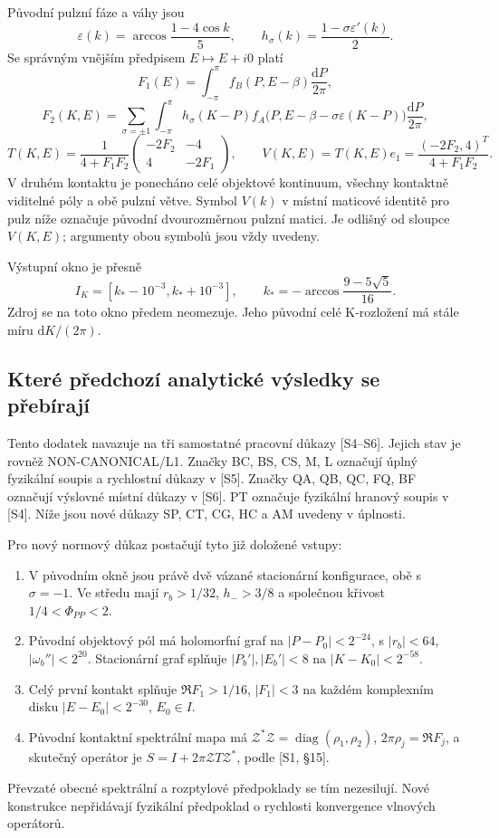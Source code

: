 \documentclass[11pt,a4paper]{article}
\theoremstyle{remark}\newtheorem{remark}[theorem]{Poznámka}
\numberwithin{equation}{section}
\begin{document}
Původní pulzní fáze a váhy jsou
\[
\varepsilon(k)=\arccos\frac{1-4\cos k}{5},\qquad
h_\sigma(k)=\frac{1-\sigma\varepsilon'(k)}2.
\]
Se správným vnějším předpisem \(E\mapsto E+i0\) platí
\[
F_1(E)=\int_{-\pi}^{\pi}f_B(P,E-\beta)\frac{\mathrm dP}{2\pi},
\]
\[
F_2(K,E)=\sum_{\sigma=\pm1}\int_{-\pi}^{\pi}
h_\sigma(K-P)f_A\bigl(P,E-\beta-\sigma\varepsilon(K-P)\bigr)
\frac{\mathrm dP}{2\pi},
\]
\[
T(K,E)=\frac1{4+F_1F_2}
\begin{pmatrix}-2F_2&-4\\4&-2F_1\end{pmatrix},\qquad
V(K,E)=T(K,E)e_1=\frac{(-2F_2,4)^T}{4+F_1F_2}.
\]
V druhém kontaktu je ponecháno celé objektové kontinuum,
všechny kontaktně viditelné póly a obě pulzní větve. Symbol
\(V(k)\) v místní maticové identitě pro pulz níže označuje
původní dvourozměrnou pulzní matici. Je odlišný od sloupce
\(V(K,E)\); argumenty obou symbolů jsou vždy uvedeny.


Výstupní okno je přesně
\[
I_K=[k_*-10^{-3},k_*+10^{-3}],\qquad
k_*=-\arccos\frac{9-5\sqrt5}{16}.
\]
Zdroj se na toto okno předem neomezuje. Jeho původní celé
K-rozložení má stále míru \(\mathrm dK/(2\pi)\).

\subsection{Které předchozí analytické výsledky se přebírají}

Tento dodatek navazuje na tři samostatné pracovní důkazy
[S4--S6]. Jejich stav je rovněž NON-CANONICAL/L1.
Značky BC, BS, CS, M, L označují úplný fyzikální soupis
a rychlostní důkazy v [S5]. Značky QA, QB, QC, FQ, BF
označují výslovné místní důkazy v [S6]. PT označuje
fyzikální hranový soupis v [S4]. Níže jsou nové důkazy
SP, CT, CG, HC a AM uvedeny v úplnosti.

Pro nový normový důkaz postačují tyto již doložené vstupy:
\begin{enumerate}
\item V původním okně jsou právě dvě vázané stacionární
konfigurace, obě s \(\sigma=-1\). Ve středu mají
\(r_b>1/32\), \(h_->3/8\) a společnou křivost
\(1/4<\Phi_{PP}<2\).
\item Původní objektový pól má holomorfní graf na
\(|P-P_0|<2^{-24}\), s \(|r_b|<64\),
\(|\omega_b''|<2^{20}\). Stacionární graf splňuje
\(|P_b'|,|E_b'|<8\) na \(|K-K_0|<2^{-58}\).
\item Celý první kontakt splňuje
\(\Re F_1>1/16\), \(|F_1|<3\) na každém komplexním
disku \(|E-E_0|<2^{-30}\), \(E_0\in I\).
\item Původní kontaktní spektrální mapa má
\(\mathcal Z^*\mathcal Z=\operatorname{diag}(\rho_1,\rho_2)\),
\(2\pi\rho_j=\Re F_j\), a skutečný operátor je
\(S=I+2\pi\mathcal ZT\mathcal Z^*\), podle [S1, §15].
\end{enumerate}
Převzaté obecné spektrální a rozptylové předpoklady se tím
nezesilují. Nové konstrukce nepřidávají fyzikální předpoklad
o rychlosti konvergence vlnových operátorů.
\end{document}
